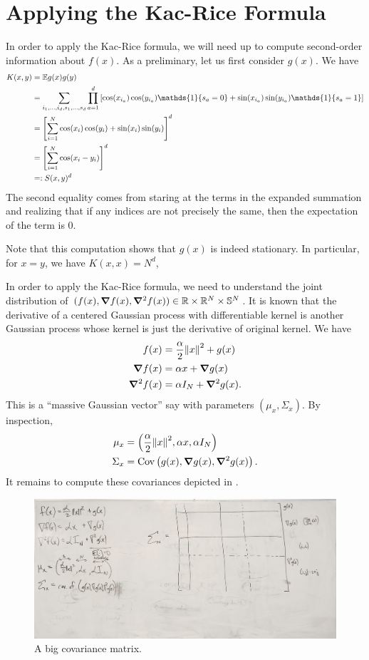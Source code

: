 \documentclass[12pt]{article}
\DeclareMathOperator{\Cov}{Cov}
\DeclarePairedDelimiter{\set}{\lbrace}{\rbrace}
\newcommand{\R}{\mathbb{R}}
\renewcommand{\S}{\mathbb{S}}
\newcommand{\E}{\mathbb{E}}
\newcommand{\ones}{\mathds{1}}
\begin{document}
\section{Applying the Kac-Rice Formula}
In order to apply the Kac-Rice formula,
we will need up to compute second-order information about $f(x)$.
As a preliminary,
let us first consider $g(x)$.
We have
\begin{align*}
  K(x, y)
  &= \E g(x)g(y) \\
  &= \sum_{i_1, \dots, i_d, s_1, \dots, s_d}
  \prod_{a=1}^d \left[ \cos(x_{i_a})\cos(y_{i_a})\ones\set{s_a=0} + \sin(x_{i_a})\sin(y_{i_a})\ones\set{s_a=1} \right] \\
  &= \left[ \sum_{i=1}^N \cos(x_i)\cos(y_i) + \sin(x_i)\sin(y_i) \right]^d \\
  &= \left[ \sum_{i=1}^N \cos(x_i-y_i) \right]^d \\
  &=: S(x, y)^d
\end{align*}
The second equality comes from staring at the terms in the expanded summation
and realizing that if any indices are not precisely the same,
then the expectation of the term is 0.

Note that this computation shows that $g(x)$ is indeed stationary.
In particular,
for $x=y$,
we have $K(x, x) = N^d$,

In order to apply the Kac-Rice formula,
we need to understand the joint distribution
of $(f(x), \grad f(x), \grad^2 f(x))\in \R\times \R^N\times \S^N$.
It is known that the derivative of a centered Gaussian process
with differentiable kernel is another Gaussian process
whose kernel is just the derivative of original kernel.
We have
\begin{align*}
  f(x) &= \frac\alpha2 \norm{x}^2 + g(x) \\
  \grad f(x) &= \alpha x + \grad g(x) \\
  \grad^2 f(x) &= \alpha I_N + \grad^2 g(x).
\end{align*}
This is a ``massive Gaussian vector'' say with parameters $(\mu_x, \Sigma_x)$.
By inspection,
\begin{align*}
  \mu_x &= \left( \frac\alpha2 \norm{x}^2, \alpha x, \alpha I_N \right) \\
  \Sigma_x &= \Cov\left( g(x), \grad g(x), \grad^2 g(x) \right).
\end{align*}
It remains to compute these covariances depicted in .
\begin{figure}[h]
  \centering
  \includegraphics[width=\linewidth]{fig/empty_matrix.jpeg}
  \caption{A big covariance matrix.}
  \label{fig:empty matrix}
\end{figure}
\end{document}
